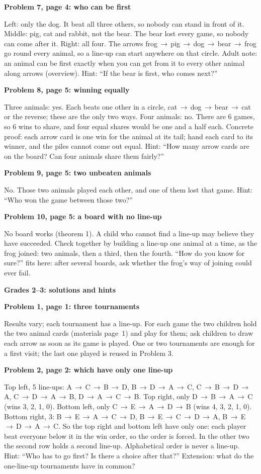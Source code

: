 \documentclass[11pt]{article}
\newcommand{\head}[1]{\par\needspace{6\baselineskip}\vspace{2pt}\textbf{\large #1}\par}
\newcommand{\sub}[1]{\par\needspace{3\baselineskip}\textbf{#1}\par}
\newcommand{\bt}{\,$\to$\,\allowbreak}
\begin{document}
\sub{Problem 7, page 4: who can be first}
Left: only the dog. It beat all three others, so nobody can stand in front of it. Middle: pig, cat and rabbit, not the bear. The bear lost every game, so nobody can come after it. Right: all four. The arrows frog\bt pig\bt dog\bt bear\bt frog go round every animal, so a line-up can start anywhere on that circle. Adult note: an animal can be first exactly when you can get from it to every other animal along arrows (overview). Hint: ``If the bear is first, who comes next?''

\sub{Problem 8, page 5: winning equally}
Three animals: yes. Each beats one other in a circle, cat\bt dog\bt bear\bt cat or the reverse; these are the only two ways. Four animals: no. There are 6 games, so 6 wins to share, and four equal shares would be one and a half each. Concrete proof: each arrow card is one win for the animal at its tail; hand each card to its winner, and the piles cannot come out equal. Hint: ``How many arrow cards are on the board? Can four animals share them fairly?''

\sub{Problem 9, page 5: two unbeaten animals}
No. Those two animals played each other, and one of them lost that game. Hint: ``Who won the game between those two?''

\sub{Problem 10, page 5: a board with no line-up}
No board works (theorem 1). A child who cannot find a line-up may believe they have succeeded. Check together by building a line-up one animal at a time, as the frog joined: two animals, then a third, then the fourth. ``How do you know for sure?'' fits here: after several boards, ask whether the frog's way of joining could ever fail.

\head{Grades 2--3: solutions and hints}
\sub{Problem 1, page 1: three tournaments}
Results vary; each tournament has a line-up. For each game the two children hold the two animal cards (materials page~1) and play for them; ask children to draw each arrow as soon as its game is played. One or two tournaments are enough for a first visit; the last one played is reused in Problem 3.

\sub{Problem 2, page 2: which have only one line-up}
Top left, 5 line-ups: A\bt C\bt B\bt D, B\bt D\bt A\bt C, C\bt B\bt D\bt A, C\bt D\bt A\bt B, D\bt A\bt C\bt B. Top right, only D\bt B\bt A\bt C (wins 3, 2, 1, 0). Bottom left, only C\bt E\bt A\bt D\bt B (wins 4, 3, 2, 1, 0). Bottom right, 3: B\bt E\bt A\bt C\bt D, B\bt E\bt C\bt D\bt A, B\bt E\bt D\bt A\bt C. So the top right and bottom left have only one: each player beat everyone below it in the win order, so the order is forced. In the other two the second row holds a second line-up. Alphabetical order is never a line-up. Hint: ``Who has to go first? Is there a choice after that?'' Extension: what do the one-line-up tournaments have in common?
\end{document}
